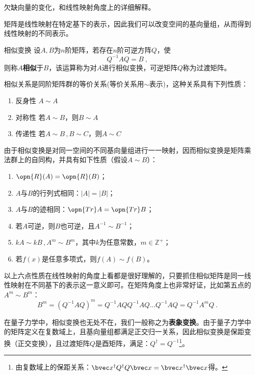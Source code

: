 
\begin{issues}
\issueDraft 欠缺向量的变化，和线性映射角度上的详细解释。
\end{issues}


矩阵是线性映射在特定基下的表示，因此我们可以改变空间的基向量组，从而得到线性映射的不同表示。
\begin{definition}{相似变换}\label{def_MatSim_1}
设$A,B$为$n$阶矩阵，若存在$n$阶可逆方阵$Q$，使
\begin{equation}
Q^{-1}AQ=B~,
\end{equation}
则称$A$\textbf{相似}于$B$，该运算称为对$A$进行相似变换，可逆矩阵$Q$称为过渡矩阵。
\end{definition}
相似关系是同阶矩阵群的等价关系(等价关系用$\sim $表示)，这种关系具有下列性质：

\begin{enumerate}
\item 反身性 $A\sim A$ 
\item 对称性 若$A\sim B$，则$B\sim A$
\item 传递性 若$A\sim B\,,B\sim C$，则$A\sim C$
\end{enumerate}
由于相似变换是对同一空间的不同基向量组进行一一映射，因而相似变换是矩阵乘法群上的自同构，并具有如下性质（假设$A\sim B$）：
\begin{enumerate}
\item $\opn{R}(A)=\opn{R}(B)$；
\item $A$与$B$的行列式相同：$|A|=|B|$；
\item $A$与$B$的迹相同：$\opn{Tr}A=\opn{Tr}B$；
\item 若$A$可逆，则$B$也可逆，且$A^{-1}\sim B^{-1}$；
\item $kA\sim kB\,,A^m\sim B^m$，其中$k$为任意常数，$m\in \mathbb Z^{+}$；
\item 若$f(x)$是任意多项式，则$f(A)\sim f(B)$。
\end{enumerate}
以上六点性质在线性映射的角度上看都是很好理解的，只要抓住相似矩阵是同一线性映射在不同基下的表示这一意义即可。在矩阵角度上也非常好证，比如第五点的$A^m\sim B^m$：\begin{equation}
B^m=(Q^{-1}AQ)^m=Q^{-1}AQQ^{-1}AQ...Q^{-1}AQ=Q^{-1}A^mQ~.
\end{equation}

在量子力学中，相似变换也无处不在，我们一般称之为\textbf{表象变换}。由于量子力学中的矩阵定义在复数域上，且基向量组都满足正交归一关系，因此相似变换是保距变换（正交变换），且过渡矩阵$Q$是酉矩阵，满足：$Q^{\dagger}=Q^{-1}$\footnote{由复数域上的保距关系：$\bvec x^{\dagger}Q^{\dagger}Q\bvec x=\bvec x^{\dagger}\bvec x$得。}。

